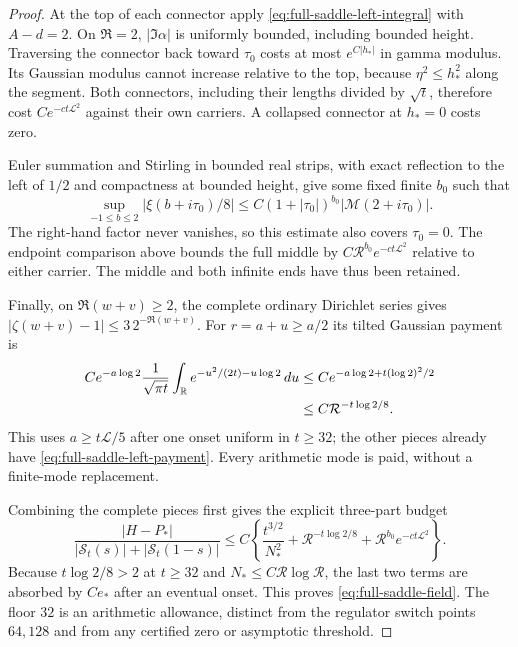 \begin{proof}
At the top of each connector apply
\eqref{eq:full-saddle-left-integral} with $A-d=2$.
On $\Re=2$, $|\Im\alpha|$ is uniformly bounded, including bounded
height. Traversing the connector back toward $\tau_0$ costs at most
$e^{C|h_*|}$ in gamma modulus. Its Gaussian modulus cannot increase
relative to the top, because $\eta^2\le h_*^2$ along the segment.
Both connectors, including their lengths divided by $\sqrt t$, therefore
cost $Ce^{-ct\mathcal L^2}$ against their own carriers. A collapsed
connector at $h_*=0$ costs zero.

Euler summation and Stirling in bounded real strips, with exact
reflection to the left of $1/2$ and compactness at bounded height, give
some fixed finite $b_0$ such that
\begin{equation}
 \sup_{-1\le b\le2}|\xi(b+i\tau_0)/8|
 \le C(1+|\tau_0|)^{b_0}|\mathcal M(2+i\tau_0)|.
 \label{eq:full-saddle-middle}
\end{equation}
The right-hand factor never vanishes, so this estimate also covers
$\tau_0=0$. The endpoint comparison above bounds the full middle by
$C\mathcal R^{b_0}e^{-ct\mathcal L^2}$ relative to either carrier.
The middle and both infinite ends have thus been retained.

Finally, on $\Re(w+v)\ge2$, the complete ordinary Dirichlet series
\cite{DLMFZetaOuter2026} gives
$|\zeta(w+v)-1|\le3\,2^{-\Re(w+v)}$.
For $r=a+u\ge a/2$ its tilted Gaussian payment is
\begin{align}
 Ce^{-a\log2}\frac1{\sqrt{\pi t}}
       \int_\mathbb R e^{-u^2/(2t)-u\log2}\,du
 &\le Ce^{-a\log2+t(\log2)^2/2}\notag\\
 &\le C\mathcal R^{-t\log2/8}.
 \label{eq:full-saddle-arithmetic}
\end{align}
This uses $a\ge t\mathcal L/5$ after one onset uniform in $t\ge32$;
the other pieces already have \eqref{eq:full-saddle-left-payment}.
Every arithmetic mode is paid, without a finite-mode replacement.

Combining the complete pieces first gives the explicit three-part budget
\begin{equation}
 \frac{|H-P_*|}{|\mathcal S_t(s)|+|\mathcal S_t(1-s)|}
 \le C\left\{\frac{t^{3/2}}{N_*^2}
       +\mathcal R^{-t\log2/8}
       +\mathcal R^{b_0}e^{-ct\mathcal L^2}\right\}.
 \label{eq:full-saddle-three-payments}
\end{equation}
Because $t\log2/8>2$ at $t\ge32$ and $N_*\le C\mathcal R\log\mathcal R$,
the last two terms are absorbed by $Ce_*$ after an eventual onset.
This proves \eqref{eq:full-saddle-field}. The floor $32$ is an
arithmetic allowance, distinct from the regulator switch points $64,128$
and from any certified zero or asymptotic threshold.
\end{proof}

